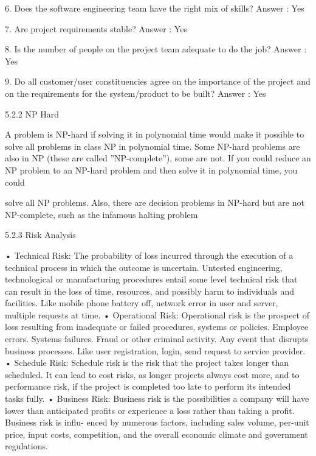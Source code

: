 \documentclass[oneside,a4paper,12pt]{report}
\begin{document}
{6.	Does the software engineering team have the right mix of skills?
Answer : Yes

7.	Are project requirements stable?
Answer : Yes

8.	Is the number of people on the project team adequate to do the job?
Answer : Yes

9.	Do all customer/user constituencies agree on the importance of the project and on the requirements for the system/product to be built?
Answer : Yes

5.2.2	NP Hard

A problem is NP-hard if solving it in polynomial time would make it possible to solve all problems in class NP in polynomial time. Some NP-hard problems are also in NP (these are called ”NP-complete”), some are not. If you could reduce an NP problem to an NP-hard problem and then solve it in polynomial time, you could

solve all NP problems. Also, there are decision problems in NP-hard but are not NP-complete, such as the infamous halting problem

5.2.3	Risk Analysis

•	Technical Risk:
The probability of loss incurred through the execution of a technical process in which the outcome is uncertain. Untested engineering, technological or manufacturing procedures entail some level technical risk that can result in the loss of time, resources, and possibly harm to individuals and facilities. Like mobile phone battery off, network error in user and server, multiple requests at time.
•	Operational Risk:
Operational risk is the prospect of loss resulting from inadequate or failed procedures, systems or policies. Employee errors. Systems failures. Fraud or other criminal activity. Any event that disrupts business processes. Like user registration, login, send request to service provider.
\newline
\newline
•	Schedule Risk:
Schedule risk is the risk that the project takes longer than scheduled. It can lead to cost risks, as longer projects always cost more, and to performance risk, if the project is completed too late to perform its intended tasks fully.
\newline
\newline
•	Business Risk:
Business risk is the possibilities a company will have lower than anticipated profits or experience a loss rather than taking a profit. Business risk is influ- enced by numerous factors, including sales volume, per-unit price, input costs, competition, and the overall economic climate and government regulations.

}
\end{document}
